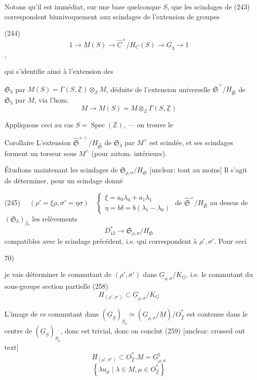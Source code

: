 Notons qu'il est immédiat, sur une
base quelconque $S$, que les scindages
de (243) correspondent biunivoquement
aux scindages de l'extension de
groupes

(244) $$1 \to \underline{M}(S) \to \underline{\widehat{C}}^+ / H_{\underline{C}}(S) \to \underline{G}_3 \to 1$$ ,

qui s'identifie ainsi à l'extension des

\newpage


$\mathfrak{S}_3$ par $M(S) = \Gamma(S, \underline{\mathbb{Z}}) \otimes_{\mathbb{Z}} M$, déduite
de l'extension universelle $\widehat{\mathfrak{S}}^+ / H_{\widehat{\mathfrak{S}}}$ de
$\mathfrak{S}_3$ par $M$, via l'hom.
$$M \to M(S) = M \otimes_{\mathbb{Z}} \Gamma(S, \underline{\mathbb{Z}})$$

Appliquons ceci au cas $S = \operatorname{Spec}(\mathbb{Z})$,
— on trouve le

Corollaire L'extension $\widehat{\mathfrak{S}}^{+\wedge} / H_{\widehat{\mathfrak{S}}}$ de
$\mathfrak{S}_3$ par $M^\wedge$ est scindée, et ses
scindages forment un torseur sous
$M^\wedge$ (pour autom. intérieurs).

Étudions maintenant les
scindages de $\mathfrak{S}_{\rho, \sigma} / H_{\mathfrak{S}}$ [unclear: tout au moins]
Il s'agit de déterminer, pour
un scindage donné

(245) $\quad (\rho' = \xi \rho, \sigma' = \eta \sigma) \quad \begin{cases} \xi = a_0 \lambda_0 + a_1 \lambda_1 \\ \eta = b \delta = b(\lambda_1 - \lambda_0) \end{cases}$
de $\widehat{\mathfrak{S}}^+ / H_{\widehat{\mathfrak{S}}}$ au dessus de $(\mathfrak{S}_3)_{f_0}$
les relèvements
$$D_{12}^* \to \mathfrak{S}_{\rho, \sigma} / H_{\mathfrak{S}}$$
compatibles avec le scindage précédent, i.e.
qui correspondent à $\rho', \sigma'$. Pour ceci

\newpage


70)

je vais déterminer le commutant de $(\rho',\sigma')$ dans $\underline{G}_{\rho,\sigma}/K_{\underline{G}}$, i.e. le commutant du sous-groupe section partielle
(258) $$H_{(\rho',\sigma')} \subset \underline{G}_{\rho,\sigma} / K_{\underline{G}}$$

L'image de ce commutant dans $(\underline{G}_{\underline{S}})_{\underline{S}_0} \simeq (\underline{G}_{\rho,\sigma} / \underline{M}) / O_{\hat{\mathbb{Z}}}^*$ est contenue dans le centre de $(\underline{G}_{\underline{S}})_{\underline{S}_0}$, donc est trivial, donc on conclut
(259) [unclear: crossed out text] $$H_{(\rho',\sigma')} \subset O_{\hat{\mathbb{Z}}}^* . \underline{M} = \underline{G}_{\rho,\sigma}^\natural$$
$$ \left\{ \lambda u_\mu \mid \lambda \in \underline{M}, \mu \in O_{\hat{\mathbb{Z}}}^* \right\} $$

